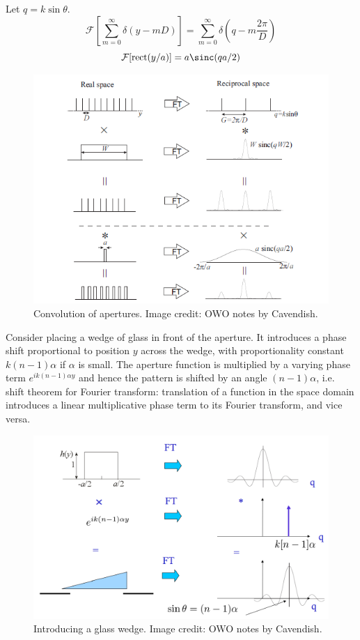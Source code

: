 \documentclass[a4paper]{article}
\begin{document}
\begin{eg}
Let $q=k\sin\theta$.
$$\mathcal{F}[\sum_{m=0}^\infty\delta(y-mD)]=\sum_{m=0}^\infty\delta(q-m\frac{2\pi}{D})$$
$$\mathcal{F}[\text{rect}(y/a)]=a\sinc(qa/2)$$
\end{eg}
\begin{figure}[H]
    \centering
    \includegraphics[scale=0.75]{convolution.PNG}
    \caption{Convolution of apertures. Image credit: OWO notes by Cavendish.}
\end{figure}
\begin{eg}
Consider placing a wedge of glass in front of the aperture. It introduces a phase shift proportional to position $y$ across the wedge, with proportionality constant $k(n-1)\alpha$ if $\alpha$ is small. The aperture function is multiplied by a varying phase term $e^{ik(n-1)\alpha y}$ and hence the pattern is shifted by an angle $(n-1)\alpha$, i.e. shift theorem for Fourier transform: translation of a function in the space domain introduces a linear multiplicative phase term to its Fourier transform, and vice versa.
\end{eg}
\begin{figure}[H]
    \centering
    \includegraphics[scale=0.6]{wedge.PNG}
    \caption{Introducing a glass wedge. Image credit: OWO notes by Cavendish.}
\end{figure}
\end{document}
